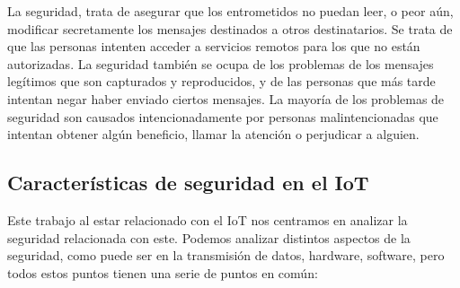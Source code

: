 {La seguridad, trata de asegurar que los entrometidos no puedan leer, o peor aún, modificar secretamente los mensajes destinados a otros destinatarios. Se trata de que las personas intenten acceder a servicios remotos para los que no están autorizadas. La seguridad también se ocupa de los problemas de los mensajes legítimos que son capturados y reproducidos, y de las personas que más tarde intentan negar haber enviado ciertos mensajes. La mayoría de los problemas de seguridad son causados intencionadamente por personas malintencionadas que intentan obtener algún beneficio, llamar la atención o perjudicar a alguien. \\ \cite{Tanenbaum2011ComputerN5}

\subsection{Características de seguridad en el IoT}

Este trabajo al estar relacionado con el IoT nos centramos en analizar la seguridad relacionada con este. Podemos analizar distintos aspectos de la seguridad, como puede ser en la transmisión de datos, hardware, software, pero todos estos puntos tienen una serie de puntos en común:

}
